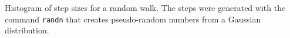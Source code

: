 \label{fig:stepsHistogram} Histogram of step sizes for a random walk. The steps were generated with the command \lstinline{randn} that creates pseudo-random numbers from a Gaussian distribution.